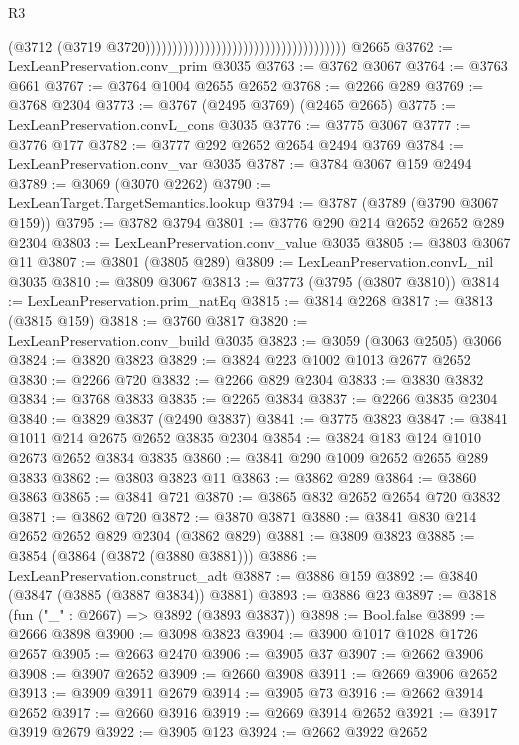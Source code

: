 \begin{lexlean}{R3}
\begin{coremodule}
                                                                          (@3712
                                                                            (@3719
                                                                              @3720)))))))))))))))))))))))))))))))))))))
    @2665
@3762 := LexLeanPreservation.conv_prim @3035
@3763 := @3762 @3067
@3764 := @3763 @661
@3767 := @3764 @1004 @2655 @2652
@3768 := @2266 @289
@3769 := @3768 @2304
@3773 := @3767 (@2495 @3769) (@2465 @2665)
@3775 := LexLeanPreservation.convL_cons @3035
@3776 := @3775 @3067
@3777 := @3776 @177
@3782 := @3777 @292 @2652 @2654 @2494 @3769
@3784 := LexLeanPreservation.conv_var @3035
@3787 := @3784 @3067 @159 @2494
@3789 := @3069 (@3070 @2262)
@3790 := LexLeanTarget.TargetSemantics.lookup
@3794 := @3787 (@3789 (@3790 @3067 @159))
@3795 := @3782 @3794
@3801 := @3776 @290 @214 @2652 @2652 @289 @2304
@3803 := LexLeanPreservation.conv_value @3035
@3805 := @3803 @3067 @11
@3807 := @3801 (@3805 @289)
@3809 := LexLeanPreservation.convL_nil @3035
@3810 := @3809 @3067
@3813 := @3773 (@3795 (@3807 @3810))
@3814 := LexLeanPreservation.prim_natEq
@3815 := @3814 @2268
@3817 := @3813 (@3815 @159)
@3818 := @3760 @3817
@3820 := LexLeanPreservation.conv_build @3035
@3823 := @3059 (@3063 @2505) @3066
@3824 := @3820 @3823
@3829 := @3824 @223 @1002 @1013 @2677 @2652
@3830 := @2266 @720
@3832 := @2266 @829 @2304
@3833 := @3830 @3832
@3834 := @3768 @3833
@3835 := @2265 @3834
@3837 := @2266 @3835 @2304
@3840 := @3829 @3837 (@2490 @3837)
@3841 := @3775 @3823
@3847 := @3841 @1011 @214 @2675 @2652 @3835 @2304
@3854 := @3824 @183 @124 @1010 @2673 @2652 @3834 @3835
@3860 := @3841 @290 @1009 @2652 @2655 @289 @3833
@3862 := @3803 @3823 @11
@3863 := @3862 @289
@3864 := @3860 @3863
@3865 := @3841 @721
@3870 := @3865 @832 @2652 @2654 @720 @3832
@3871 := @3862 @720
@3872 := @3870 @3871
@3880 := @3841 @830 @214 @2652 @2652 @829 @2304 (@3862 @829)
@3881 := @3809 @3823
@3885 := @3854 (@3864 (@3872 (@3880 @3881)))
@3886 := LexLeanPreservation.construct_adt
@3887 := @3886 @159
@3892 := @3840 (@3847 (@3885 (@3887 @3834)) @3881)
@3893 := @3886 @23
@3897 := @3818 (fun ("_" : @2667) => @3892 (@3893 @3837))
@3898 := Bool.false
@3899 := @2666 @3898
@3900 := @3098 @3823
@3904 := @3900 @1017 @1028 @1726 @2657
@3905 := @2663 @2470
@3906 := @3905 @37
@3907 := @2662 @3906
@3908 := @3907 @2652
@3909 := @2660 @3908
@3911 := @2669 @3906 @2652
@3913 := @3909 @3911 @2679
@3914 := @3905 @73
@3916 := @2662 @3914 @2652
@3917 := @2660 @3916
@3919 := @2669 @3914 @2652
@3921 := @3917 @3919 @2679
@3922 := @3905 @123
@3924 := @2662 @3922 @2652

\end{coremodule}
\end{lexlean}
